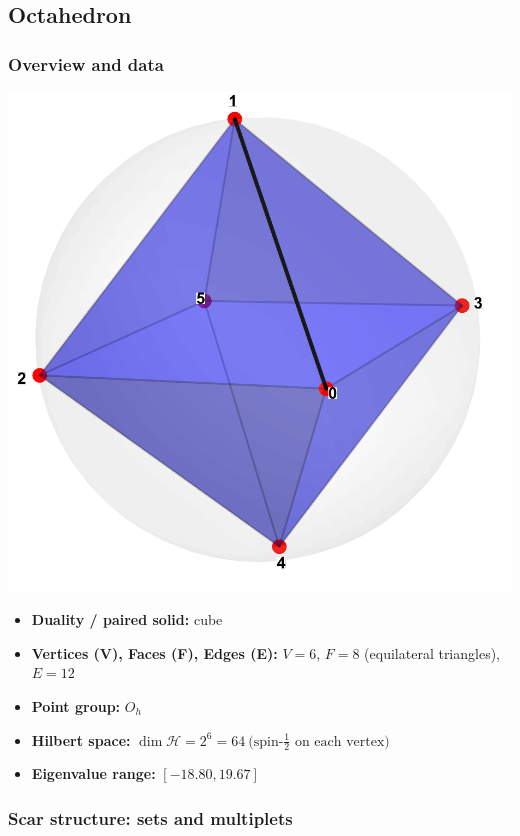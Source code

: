 \documentclass[11pt,a4paper]{article}
\begin{document}

\subsection*{Octahedron}

\subsubsection*{Overview and data}
\begin{center}
  \includegraphics[width=.6\linewidth]{octahedron}
\end{center}

\begin{itemize}[leftmargin=1.5em]
  \item \textbf{Duality / paired solid:} cube
  \item \textbf{Vertices (V), Faces (F), Edges (E):} $V = 6$,\; $F = 8$ (equilateral triangles),\; $E = 12$
  \item \textbf{Point group:} $O_h$
  \item \textbf{Hilbert space:} \(
        \dim\mathcal{H} = 2^{6} = 64\ \text{(spin-$\tfrac12$ on each vertex)}
        \)
  \item \textbf{Eigenvalue range:} $[-18.80, 19.67]$
\end{itemize}

\subsubsection*{Scar structure: sets and multiplets}
\end{document}
